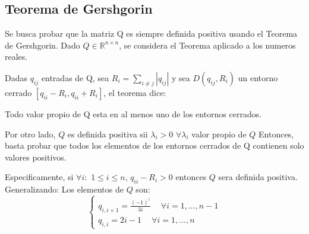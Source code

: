 \usepackage{graphicx}
\usepackage{subcaption} %
\usepackage{amssymb} %
\usepackage{amsmath} %
\usepackage{amsthm} %
    \subsection{Teorema de Gershgorin}
    Se busca probar que la matriz Q es siempre definida positiva usando el Teorema de Gershgorin.
    Dado $Q \in \mathbb{R}^{n \times n}$, se considera el Teorema aplicado a los numeros reales.

    Dadas $q_{ij}$ entradas de Q, sea $R_i = \sum_{i \neq j}\left | q_{ij} \right |$ y sea $D(q_{ij},R_i)$
    un entorno cerrado $ [q_{ii}-R_i, q_{ii}+R_i]$, el teorema dice:
    \begin{thm}
        Todo valor propio de Q esta en al menos uno de los entornos cerrados.
    \end{thm}

    Por otro lado, $Q$ es definida positiva sii $\lambda_i > 0$ $\forall \lambda_i$ valor propio de $Q$
    Entonces, basta probar que todos los elementos de los entornos cerrados de Q contienen solo valores positivos.

    Especificamente, si $\forall i:$ $1 \leq i \leq n$, $q_{ii} - R_i >0$ entonces $Q$ sera definida positiva.
    Generalizando:
    Los elementos de $Q$ son:
    \begin{equation}
        \begin{cases}
            q_{i,i+1} = \frac{(-1)^i}{3i} \phantom{-} \forall i = 1,...,n-1 \\
            q_{i,i} = 2i-1 \phantom{-} \forall i = 1,...,n
        \end{cases}
    \end{equation}


